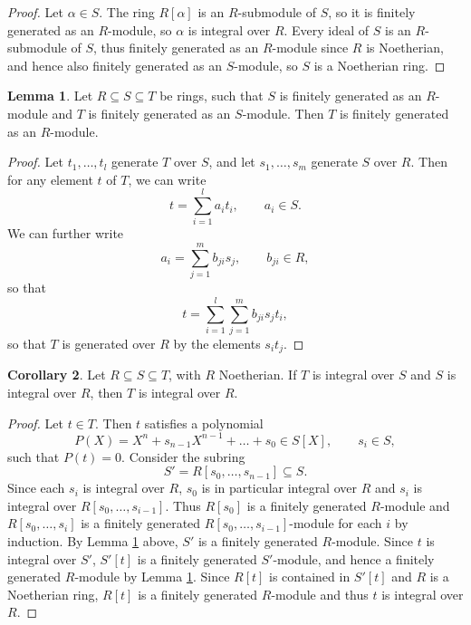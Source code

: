 \documentclass{article}
\newcommand{\rb}[1]{\left( #1 \right)}
\renewcommand{\sb}[1]{\left[ #1 \right]}
\theoremstyle{definition}\newtheorem{definition}{Definition}[subsection]
\theoremstyle{definition}\newtheorem{remark}[definition]{Remark}
\theoremstyle{definition}\newtheorem*{example}{Example}
\theoremstyle{definition}\newtheorem*{note}{Note}
\newtheorem{lemma}[definition]{Lemma}
\newtheorem{corollary}[definition]{Corollary}
\begin{document}
\begin{proof}
Let $ \alpha \in S $. The ring $ R\sb{\alpha} $ is an $ R $-submodule of $ S $, so it is finitely generated as an $ R $-module, so $ \alpha $ is integral over $ R $. Every ideal of $ S $ is an $ R $-submodule of $ S $, thus finitely generated as an $ R $-module since $ R $ is Noetherian, and hence also finitely generated as an $ S $-module, so $ S $ is a Noetherian ring.
\end{proof}

\begin{lemma}
\label{lem:10.1.5}
Let $ R \subseteq S \subseteq T $ be rings, such that $ S $ is finitely generated as an $ R $-module and $ T $ is finitely generated as an $ S $-module. Then $ T $ is finitely generated as an $ R $-module.
\end{lemma}

\begin{proof}
Let $ t_1, \dots, t_l $ generate $ T $ over $ S $, and let $ s_1, \dots, s_m $ generate $ S $ over $ R $. Then for any element $ t $ of $ T $, we can write
$$ t = \sum_{i = 1}^l a_it_i, \qquad a_i \in S. $$
We can further write
$$ a_i = \sum_{j = 1}^m b_{ji}s_j, \qquad b_{ji} \in R, $$
so that
$$ t = \sum_{i = 1}^l \sum_{j = 1}^m b_{ji}s_jt_i, $$
so that $ T $ is generated over $ R $ by the elements $ s_it_j $.
\end{proof}

\begin{corollary}
Let $ R \subseteq S \subseteq T $, with $ R $ Noetherian. If $ T $ is integral over $ S $ and $ S $ is integral over $ R $, then $ T $ is integral over $ R $.
\end{corollary}

\begin{proof}
Let $ t \in T $. Then $ t $ satisfies a polynomial
$$ P\rb{X} = X^n + s_{n - 1}X^{n - 1} + \dots + s_0 \in S\sb{X}, \qquad s_i \in S, $$
such that $ P\rb{t} = 0 $. Consider the subring
$$ S' = R\sb{s_0, \dots, s_{n - 1}} \subseteq S. $$
Since each $ s_i $ is integral over $ R $, $ s_0 $ is in particular integral over $ R $ and $ s_i $ is integral over $ R\sb{s_0, \dots, s_{i - 1}} $. Thus $ R\sb{s_0} $ is a finitely generated $ R $-module and $ R\sb{s_0, \dots, s_i} $ is a finitely generated $ R\sb{s_0, \dots, s_{i - 1}} $-module for each $ i $ by induction. By Lemma \ref{lem:10.1.5} above, $ S' $ is a finitely generated $ R $-module. Since $ t $ is integral over $ S' $, $ S'\sb{t} $ is a finitely generated $ S' $-module, and hence a finitely generated $ R $-module by Lemma \ref{lem:10.1.5}. Since $ R\sb{t} $ is contained in $ S'\sb{t} $ and $ R $ is a Noetherian ring, $ R\sb{t} $ is a finitely generated $ R $-module and thus $ t $ is integral over $ R $.
\end{proof}
\end{document}
